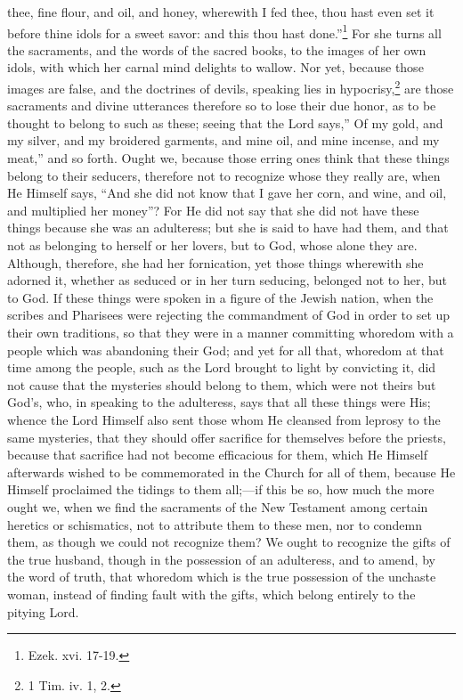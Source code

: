 thee, fine flour, and oil, and honey, wherewith I fed thee, thou hast even set it before thine idols for a sweet savor: and this thou hast done.''\footnote{\par  Ezek. xvi. 17-19.} For she turns all the sacraments, and the words of the sacred books, to the images of her own idols, with which her carnal mind delights to wallow. Nor yet, because those images are false, and the doctrines of devils, speaking lies in hypocrisy,\footnote{\par  1 Tim. iv. 1, 2.} are those sacraments and divine utterances therefore so to lose their due honor, as to be thought to belong to such as these; seeing that the Lord says,'' Of my gold, and my silver, and my broidered garments, and mine oil, and mine incense, and my meat,'' and so forth. Ought we, because those erring ones think that these things belong to their seducers, therefore not to recognize whose they really are, when He Himself says, ``And she did not know that I gave her corn, and wine, and oil, and multiplied her money''? For He did not say that she did not have these things because she was an adulteress; but she is said to have had them, and that not as belonging to herself or her lovers, but to God, whose alone they are. Although, therefore, she had her fornication, yet those things wherewith she adorned it, whether as seduced or in her turn seducing, belonged not to her, but to God. If these things were spoken in a figure of the Jewish nation, when the scribes and Pharisees were rejecting the commandment of God in order to set up their own traditions, so that they were in a manner committing whoredom with a people which was abandoning their God; and yet for all that, whoredom at that time among the people, such as the Lord brought to light by convicting it, did not cause that the mysteries should belong to them, which were not theirs but God’s, who, in speaking to the adulteress, says that all these things were His; whence the Lord Himself also sent those whom He cleansed from leprosy to the same mysteries, that they should offer sacrifice for themselves before the priests, because that sacrifice had not become efficacious for them, which He Himself afterwards wished to be commemorated in the Church for all of them, because He Himself proclaimed the tidings to them all;—if this be so, how much the more ought we, when we find the sacraments of the New Testament among certain heretics or schismatics, not to attribute them to these men, nor to condemn them, as though we could not recognize them? We ought to recognize the gifts of the true husband, though in the possession of an adulteress, and to amend, by the word of truth, that whoredom which is the true possession of the unchaste woman, instead of finding fault with the gifts, which belong entirely to the pitying Lord.


